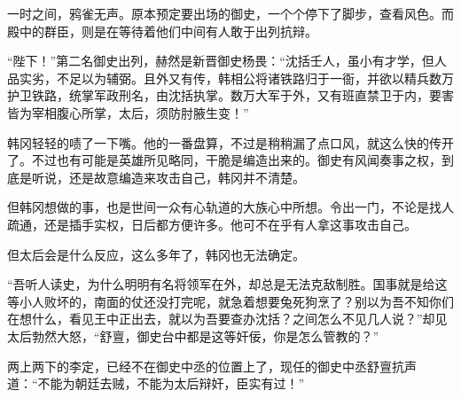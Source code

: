 一时之间，鸦雀无声。原本预定要出场的御史，一个个停下了脚步，查看风色。而殿中的群臣，则是在等待着他们中间有人敢于出列抗辩。

“陛下！”第二名御史出列，赫然是新晋御史杨畏：“沈括壬人，虽小有才学，但人品实劣，不足以为辅弼。且外又有传，韩相公将诸铁路归于一衙，并欲以精兵数万护卫铁路，统掌军政刑名，由沈括执掌。数万大军于外，又有班直禁卫于内，要害皆为宰相腹心所掌，太后，须防肘腋生变！”

韩冈轻轻的啧了一下嘴。他的一番盘算，不过是稍稍漏了点口风，就这么快的传开了。不过也有可能是英雄所见略同，干脆是编造出来的。御史有风闻奏事之权，到底是听说，还是故意编造来攻击自己，韩冈并不清楚。

但韩冈想做的事，也是世间一众有心轨道的大族心中所想。令出一门，不论是找人疏通，还是插手实权，日后都方便许多。他可不在乎有人拿这事攻击自己。

但太后会是什么反应，这么多年了，韩冈也无法确定。

“吾听人读史，为什么明明有名将领军在外，却总是无法克敌制胜。国事就是给这等小人败坏的，南面的仗还没打完呢，就急着想要兔死狗烹了？别以为吾不知你们在想什么，看见王中正出去，就以为吾要查办沈括？之间怎么不见几人说？”却见太后勃然大怒，“舒亶，御史台中都是这等奸佞，你是怎么管教的？”

两上两下的李定，已经不在御史中丞的位置上了，现任的御史中丞舒亶抗声道：“不能为朝廷去贼，不能为太后辩奸，臣实有过！”
